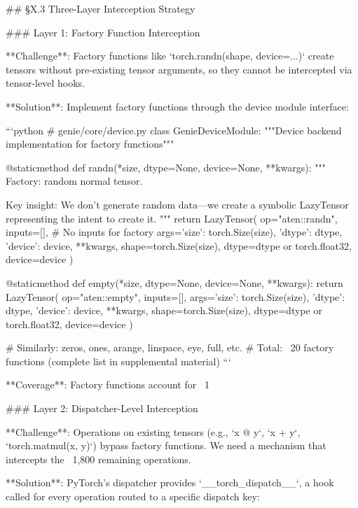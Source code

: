 ## §X.3 Three-Layer Interception Strategy

### Layer 1: Factory Function Interception

**Challenge**: Factory functions like `torch.randn(shape, device=...)` create tensors without pre-existing tensor arguments, so they cannot be intercepted via tensor-level hooks.

**Solution**: Implement factory functions through the device module interface:

```python
# genie/core/device.py
class GenieDeviceModule:
    """Device backend implementation for factory functions"""
    
    @staticmethod
    def randn(*size, dtype=None, device=None, **kwargs):
        """
        Factory: random normal tensor.
        
        Key insight: We don't generate random data—we create
        a symbolic LazyTensor representing the intent to create it.
        """
        return LazyTensor(
            op="aten::randn",
            inputs=[],  # No inputs for factory
            args={'size': torch.Size(size), 'dtype': dtype, 
                  'device': device, **kwargs},
            shape=torch.Size(size),
            dtype=dtype or torch.float32,
            device=device
        )
    
    @staticmethod  
    def empty(*size, dtype=None, device=None, **kwargs):
        return LazyTensor(
            op="aten::empty",
            inputs=[],
            args={'size': torch.Size(size), 'dtype': dtype, 
                  'device': device, **kwargs},
            shape=torch.Size(size),
            dtype=dtype or torch.float32,
            device=device
        )
    
    # Similarly: zeros, ones, arange, linspace, eye, full, etc.
    # Total: ~20 factory functions (complete list in supplemental material)
```

**Coverage**: Factory functions account for ~1%

### Layer 2: Dispatcher-Level Interception

**Challenge**: Operations on existing tensors (e.g., `x @ y`, `x + y`, `torch.matmul(x, y)`) bypass factory functions. We need a mechanism that intercepts the ~1,800 remaining operations.

**Solution**: PyTorch's dispatcher provides `__torch_dispatch__`, a hook called for every operation routed to a specific dispatch key:

